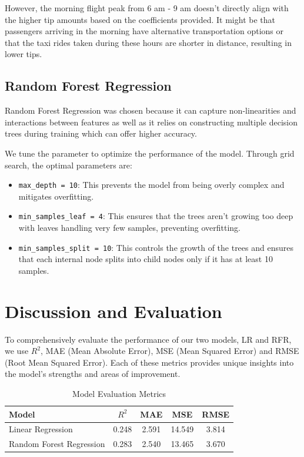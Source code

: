 \documentclass[11pt]{article}
\begin{document}
However, the morning flight peak from 6 am - 9 am doesn't directly align with the higher tip amounts based on the coefficients provided. It might be that passengers arriving in the morning have alternative transportation options or that the taxi rides taken during these hours are shorter in distance, resulting in lower tips.

\subsection{Random Forest Regression}
Random Forest Regression was chosen because it can capture non-linearities and interactions between features as well as it relies on constructing multiple decision trees during training which can offer higher accuracy. 

We tune the parameter to optimize the performance of the model. Through grid search, the optimal parameters are:

\begin{itemize}
    \item \texttt{max\_depth = 10}: This prevents the model from being overly complex and mitigates overfitting. 
    \item \texttt{min\_samples\_leaf = 4}: This ensures that the trees aren't growing too deep with leaves handling very few samples, preventing overfitting. 
    \item \texttt{min\_samples\_split = 10}: This controls the growth of the trees and ensures that each internal node splits into child nodes only if it has at least 10 samples.
\end{itemize}

\section{Discussion and Evaluation}
To comprehensively evaluate the performance of our two models, LR and RFR, we use \( R^2 \), MAE (Mean Absolute Error), MSE (Mean Squared Error) and RMSE (Root Mean Squared Error). Each of these metrics provides unique insights into the model's strengths and areas of improvement.

\begin{table}[h]
    \centering
    \caption{Model Evaluation Metrics}
    \label{tab:metrics}
    \begin{tabular}{lcccc}
        \toprule
        Model & \( R^2 \) & MAE & MSE & RMSE \\
        \midrule
        Linear Regression & 0.248 & 2.591 & 14.549 & 3.814 \\
        Random Forest Regression & 0.283 & 2.540 & 13.465 & 3.670 \\
        \bottomrule
    \end{tabular}
\end{table}
\end{document}
